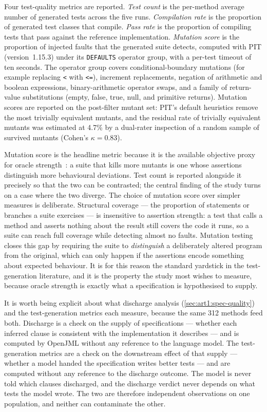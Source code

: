 Four test-quality metrics are reported. \emph{Test count} is the per-method
average number of generated tests across the five runs. \emph{Compilation rate} is
the proportion of generated test classes that compile. \emph{Pass rate} is the
proportion of compiling tests that pass against the reference implementation.
\emph{Mutation score} is the proportion of injected faults that the generated
suite detects, computed with PIT (version~1.15.3) under its \texttt{DEFAULTS}
operator group, with a per-test timeout of ten seconds. The operator group covers
conditional-boundary mutations (for example replacing \texttt{<} with
\texttt{<=}), increment replacements, negation of arithmetic and boolean
expressions, binary-arithmetic operator swaps, and a family of return-value
substitutions (empty, false, true, null, and primitive returns). Mutation scores
are reported on the post-filter mutant set: PIT's default heuristics remove the
most trivially equivalent mutants, and the residual rate of trivially equivalent
mutants was estimated at 4.7\% by a dual-rater inspection of a random sample of
survived mutants (Cohen's $\kappa = 0.83$).

Mutation score is the headline metric because it is the available objective proxy
for oracle strength~\citep{barr2015oracle}: a suite that kills more mutants is one
whose assertions distinguish more behavioural deviations. Test count is reported
alongside it precisely so that the two can be contrasted; the central finding of
the study turns on a case where the two diverge. The choice of mutation score over
simpler measures is deliberate. Structural coverage --- the proportion of
statements or branches a suite exercises --- is insensitive to assertion strength:
a test that calls a method and asserts nothing about the result still covers the
code it runs, so a suite can reach full coverage while detecting almost no faults.
Mutation testing closes this gap by requiring the suite to \emph{distinguish} a
deliberately altered program from the original, which can only happen if the
assertions encode something about expected behaviour. It is for this reason the
standard yardstick in the test-generation literature, and it is the property the
study most wishes to measure, because oracle strength is exactly what a
specification is hypothesised to supply.

It is worth being explicit about what discharge analysis (\cref{sec:art1:spec-quality})
and the test-generation metrics each measure, because the same 312 methods feed
both. Discharge is a check on the supply of specifications --- whether each
inferred clause is consistent with the implementation it describes --- and is
computed by OpenJML without any reference to the language model. The
test-generation metrics are a check on the downstream effect of that supply ---
whether a model handed the specification writes better tests --- and are computed
without any reference to the discharge outcome. The model is never told which
clauses discharged, and the discharge verdict never depends on what tests the
model wrote. The two are therefore independent observations on one population, and
neither can contaminate the other.

